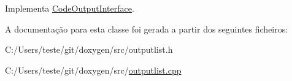 Implementa \hyperlink{class_code_output_interface_a4ab86013abbf61a86e9c300eb805939a}{Code\-Output\-Interface}.



A documentação para esta classe foi gerada a partir dos seguintes ficheiros\-:\begin{DoxyCompactItemize}
\item 
C\-:/\-Users/teste/git/doxygen/src/outputlist.\-h\item 
C\-:/\-Users/teste/git/doxygen/src/\hyperlink{outputlist_8cpp}{outputlist.\-cpp}\end{DoxyCompactItemize}

